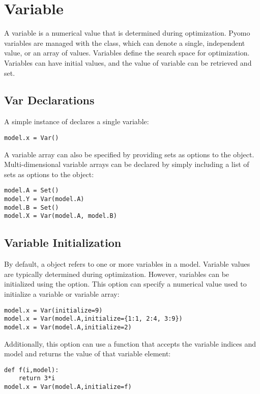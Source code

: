 \section{Variable}

A variable is a numerical value that is determined during optimization.
Pyomo variables are managed with the  class, which can denote
a single, independent value, or an array of values.  Variables define
the search space for optimization.  Variables can have initial values,
and the value of variable can be retrieved and set.


\subsection{Var Declarations}

A simple instance of  declares a single variable:
\begin{lstlisting}
model.x = Var()
\end{lstlisting}
A variable array can also be specified by providing sets as options
to the  object.  Multi-dimensional variable arrays can be declared by simply including a list of sets as options to the  object:
\begin{lstlisting}
model.A = Set()
model.Y = Var(model.A)
model.B = Set()
model.X = Var(model.A, model.B)
\end{lstlisting}


\subsection{Variable Initialization}

By default, a  object refers to one or more variables in a model.  Variable
values are typically determined during optimization.  However, variables can 
be initialized using the  option.
This option can specify a numerical value used to 
initialize a variable or variable array:
\begin{lstlisting}
model.x = Var(initialize=9)
model.x = Var(model.A,initialize={1:1, 2:4, 3:9})
model.x = Var(model.A,initialize=2)
\end{lstlisting}
Additionally, this option can use a function 
that accepts the variable indices and model and returns the value of that variable element:
\begin{lstlisting}
def f(i,model):
    return 3*i
model.x = Var(model.A,initialize=f)
\end{lstlisting}


